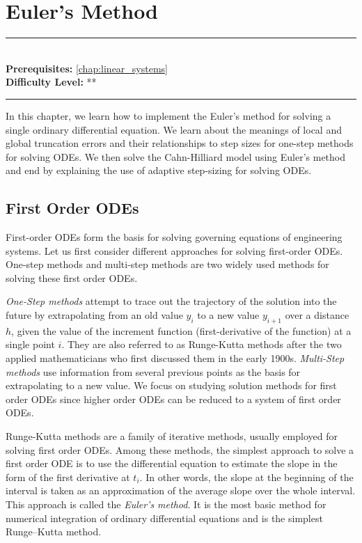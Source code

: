 \documentclass[book.tex]{subfiles}
\begin{document}
\chapter{Euler's Method}

\label{chap:ode_euler}
\noindent\rule{11cm}{0.4pt} \\
\textbf{Prerequisites:} \autoref{chap:linear_systems} \\
\textbf{Difficulty Level:} ** \\
\noindent\rule{11cm}{0.4pt}
\vspace{5mm}

In this chapter, we learn how to implement the Euler's method for solving a single ordinary differential equation. We learn about the meanings of local and global truncation errors and their relationships to step sizes for one-step methods for solving ODEs. We then solve the Cahn-Hilliard model using Euler's method and end by explaining the use of adaptive step-sizing for solving ODEs.

\section{First Order ODEs}

First-order ODEs form the basis for solving governing equations of engineering systems. Let us first consider different approaches for solving first-order ODEs. %
One-step methods and multi-step methods are two widely used methods for solving these first order ODEs. 

\textit{One-Step methods} attempt to trace out the trajectory of the solution into the future by extrapolating from an old value $y_i$ to a new value $y_{i+1}$ over a distance $h$, given the value of the increment function (first-derivative of the function) at a single point $i$. They are also referred to as Runge-Kutta methods after the two applied mathematicians who first discussed them in the early 1900s. \textit{Multi-Step methods} use information from several previous points as the basis for extrapolating to a new value. We focus on studying solution methods for first order ODEs since higher order ODEs can be reduced to a system of first order ODEs.  %

Runge-Kutta methods are a family of iterative methods, usually employed for solving first order ODEs. Among these methods, the simplest approach to solve a first order ODE is to use the differential equation to estimate the slope in the form of the first derivative at $t_i$. In other words, the slope at the beginning of the interval is taken as an approximation of the average slope over the whole interval. This approach is called the \textit{Euler’s method}. It is the most basic method for numerical integration of ordinary differential equations and is the simplest Runge–Kutta method.
\end{document}
